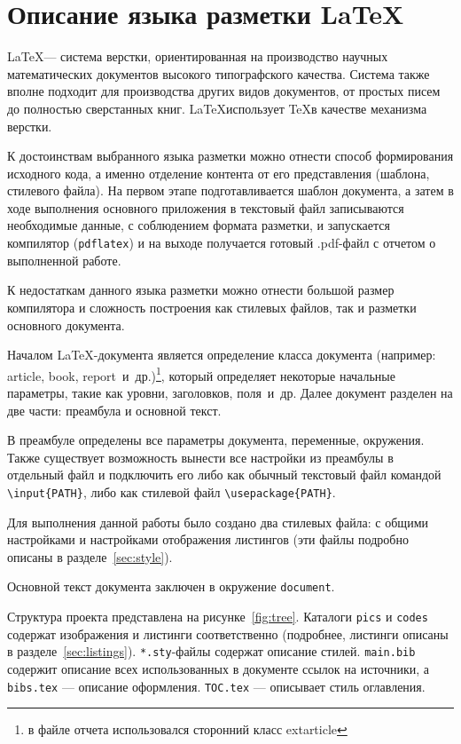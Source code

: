 \section{Описание языка разметки \LaTeX}
\label{sec:latex}
\LaTeX --- система верстки, ориентированная на производство научных математических документов высокого типографского качества. Система также вполне подходит для производства других видов документов, от простых писем до полностью сверстанных книг. \LaTeX использует \TeX в качестве механизма верстки.~\cite{lshort}

К достоинствам выбранного языка разметки можно отнести способ формирования исходного кода, а именно отделение контента от его представления (шаблона, стилевого файла). На первом этапе подготавливается шаблон документа, а затем в ходе выполнения основного приложения в текстовый файл записываются необходимые данные, с соблюдением формата разметки, и запускается компилятор (\texttt{pdflatex}) и на выходе получается готовый .pdf-файл с отчетом о выполненной работе.

К недостаткам данного языка разметки можно отнести большой размер компилятора и сложность построения как стилевых файлов, так и разметки основного документа.

Началом \LaTeX-документа является определение класса документа (например: article, book, report~и~др.)\footnote{в файле отчета использовался сторонний класс extarticle}, который определяет некоторые начальные параметры, такие как уровни, заголовков, поля~и~др. Далее документ разделен на две части: преамбула и основной текст.

В преамбуле определены все параметры документа, переменные, окружения\cite{gritsaenko_latexmanual}. Также существует возможность вынести все настройки из преамбулы в отдельный файл и подключить его либо как обычный текстовый файл командой \texttt{\textbackslash input\{PATH\}}, либо как стилевой файл \texttt{\textbackslash usepackage\{PATH\}}.

Для выполнения данной работы было создано два стилевых файла: с общими настройками и настройками отображения листингов (эти файлы подробно описаны в разделе~\ref{sec:style}).

Основной текст документа заключен в окружение \texttt{document}.

Структура проекта представлена на рисунке~\ref{fig:tree}. Каталоги \texttt{pics} и \texttt{codes} содержат изображения и листинги соответственно (подробнее, листинги описаны в разделе~\ref{sec:listings}). \texttt{*.sty}-файлы содержат описание стилей. \texttt{main.bib} содержит описание всех использованных в документе ссылок на источники, а \texttt{bibs.tex} --- описание оформления. \texttt{TOC.tex} --- описывает стиль оглавления.

